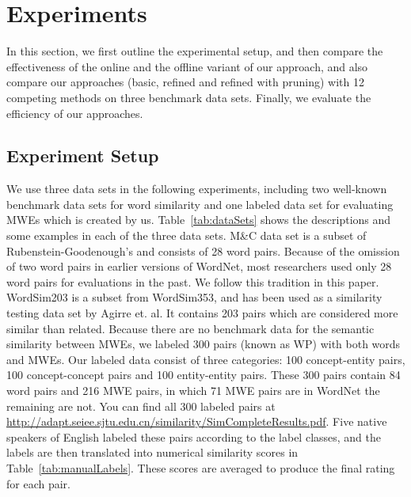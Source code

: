 \section{Experiments}
\label{sec:eval}

In this section, we first outline the experimental setup,
and then compare the effectiveness of the online and the offline
variant of our approach, and also compare our approaches
(basic, refined and refined with pruning) with 12 competing
methods on three benchmark data sets.
Finally, we evaluate the efficiency of our approaches.

\subsection{Experiment Setup}
We use three data sets in the following experiments, including two well-known benchmark data sets for word similarity and one labeled data set
for evaluating MWEs which is created by us. Table~\ref{tab:dataSets} shows the descriptions and some examples in each of the three data sets.
M\&C data set is a subset of Rubenstein-Goodenough's \cite{Rubenstein:1965}
and consists of 28 word pairs.
Because of the omission of two word
pairs in earlier versions of WordNet, most researchers used only
28 word pairs for evaluations in the past. We follow this tradition in this paper.
WordSim203 is a subset from WordSim353\cite{wordSim:353}, and has been
used as a similarity testing data set by Agirre et. al.\cite{Agirre:2009}
It contains 203 pairs which are considered more similar than related.
Because there are no benchmark data for the semantic similarity between
MWEs, we labeled 300 pairs (known as WP) with both words and MWEs. Our labeled data consist of three categories: 100 concept-entity pairs, 100
concept-concept pairs and 100 entity-entity pairs. These 300 pairs contain 84 word pairs and 216 MWE pairs, in which 71 MWE pairs are in WordNet
the remaining are not. You can find all 300 labeled pairs at \url{http://adapt.seiee.sjtu.edu.cn/similarity/SimCompleteResults.pdf}.
Five native speakers of English labeled these pairs according to the label classes, and the labels are then translated into numerical similarity
scores in Table~\ref{tab:manualLabels}. These scores are averaged to produce
the final rating for each pair.

